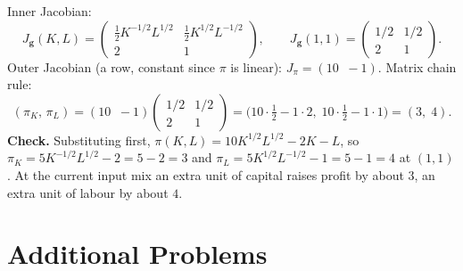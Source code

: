 \begin{solutions}
  \item Inner Jacobian:
        \[
          J_{\mathbf{g}}(K,L)=\begin{pmatrix}
            \tfrac12K^{-1/2}L^{1/2}&\tfrac12K^{1/2}L^{-1/2}\\
            2&1\end{pmatrix},\qquad
          J_{\mathbf{g}}(1,1)=\begin{pmatrix}1/2&1/2\\2&1\end{pmatrix} .
        \]
        Outer Jacobian (a row, constant since $\pi$ is linear):
        $J_{\pi}=(10\;\;-1)$. Matrix chain rule:
        \[
          (\pi_{K},\,\pi_{L})
            =(10\;\;-1)\begin{pmatrix}1/2&1/2\\2&1\end{pmatrix}
            =\bigl(10\cdot\tfrac12-1\cdot 2,\;
              10\cdot\tfrac12-1\cdot 1\bigr)
            =(3,\;4) .
        \]
        \textbf{Check.} Substituting first,
        $\pi(K,L)=10K^{1/2}L^{1/2}-2K-L$, so
        $\pi_{K}=5K^{-1/2}L^{1/2}-2=5-2=3$ and
        $\pi_{L}=5K^{1/2}L^{-1/2}-1=5-1=4$ at $(1,1)$. \checkmark
        At the current input mix an extra unit of capital raises profit
        by about $3$, an extra unit of labour by about $4$.
\end{solutions}

\section{Additional Problems}

